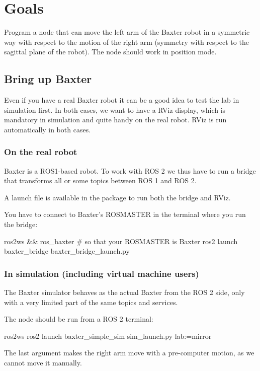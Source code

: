 \documentclass{ecnreport}
\author{O. Kermorgant}
\begin{document}


\section{Goals}

Program a node that can move the left arm of the Baxter robot in a symmetric way with respect to
the motion of the right arm (symmetry with respect to the sagittal plane of the robot).
The node should work in position mode. \\

\subsection{Bring up Baxter}

Even if you have a real Baxter robot it can be a good idea to test the lab in simulation first.
In both cases, we want to have a RViz display, which is mandatory in simulation and quite handy on the real robot. RViz is run automatically in both cases.

\subsubsection{On the real robot}

Baxter is a ROS1-based robot. To work with ROS 2 we thus have to run a bridge that transforms all or some topics between ROS 1 and ROS 2.

A launch file is available in the  package to run both the bridge and RViz.

You have to connect to Baxter's ROSMASTER in the terminal where you run the bridge:
\begin{bashcodelarge}
 ros2ws && ros_baxter # so that your ROSMASTER is Baxter
 ros2 launch baxter_bridge baxter_bridge_launch.py
\end{bashcodelarge}

\subsubsection{In simulation (including virtual machine users)}

The Baxter simulator behaves as the actual Baxter from the ROS 2 side, only with a very limited part of the same topics and services. 

The  node should be run from a ROS 2 terminal:
\begin{bashcodelarge}
ros2ws
ros2 launch baxter_simple_sim sim_launch.py lab:=mirror
\end{bashcodelarge}
The last argument makes the right arm move with a pre-computer motion, as we cannot move it manually.
\end{document}
